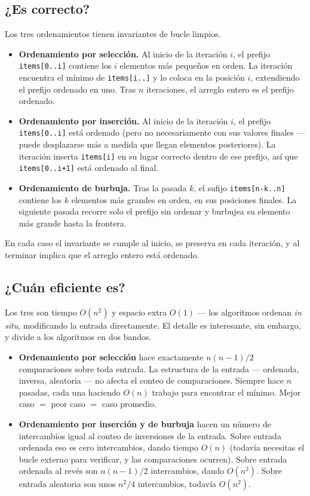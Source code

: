 \documentclass[11pt,a4paper]{article}
\begin{document}
\subsection*{¿Es correcto?}

Los tres ordenamientos tienen invariantes de bucle limpios.

\begin{itemize}
\item \textbf{Ordenamiento por selección.} Al inicio de la iteración $i$, el prefijo \texttt{items[0..i]} contiene los $i$ elementos más pequeños en orden. La iteración encuentra el mínimo de \texttt{items[i..]} y lo coloca en la posición $i$, extendiendo el prefijo ordenado en uno. Tras $n$ iteraciones, el arreglo entero es el prefijo ordenado.
\item \textbf{Ordenamiento por inserción.} Al inicio de la iteración $i$, el prefijo \texttt{items[0..i]} está ordenado (pero no necesariamente con sus valores finales --- puede desplazarse más a medida que llegan elementos posteriores). La iteración inserta \texttt{items[i]} en su lugar correcto dentro de ese prefijo, así que \texttt{items[0..i+1]} está ordenado al final.
\item \textbf{Ordenamiento de burbuja.} Tras la pasada $k$, el sufijo \texttt{items[n-k..n]} contiene los $k$ elementos más grandes en orden, en sus posiciones finales. La siguiente pasada recorre solo el prefijo sin ordenar y burbujea su elemento más grande hasta la frontera.
\end{itemize}

En cada caso el invariante se cumple al inicio, se preserva en cada iteración, y al terminar implica que el arreglo entero está ordenado.

\subsection*{¿Cuán eficiente es?}

Los tres son tiempo $O(n^2)$ y espacio extra $O(1)$ --- los algoritmos ordenan \emph{in situ}, modificando la entrada directamente. El detalle es interesante, sin embargo, y divide a los algoritmos en dos bandos.

\begin{itemize}
\item \textbf{Ordenamiento por selección} hace exactamente $n(n-1)/2$ comparaciones sobre toda entrada. La estructura de la entrada --- ordenada, inversa, aleatoria --- no afecta el conteo de comparaciones. Siempre hace $n$ pasadas, cada una haciendo $O(n)$ trabajo para encontrar el mínimo. Mejor caso $=$ peor caso $=$ caso promedio.
\item \textbf{Ordenamiento por inserción y de burbuja} hacen un número de intercambios igual al conteo de inversiones de la entrada. Sobre entrada ordenada eso es cero intercambios, dando tiempo $O(n)$ (todavía necesitas el bucle externo para verificar, y las comparaciones ocurren). Sobre entrada ordenada al revés son $n(n-1)/2$ intercambios, dando $O(n^2)$. Sobre entrada aleatoria son unos $n^2/4$ intercambios, todavía $O(n^2)$.
\end{itemize}
\end{document}

